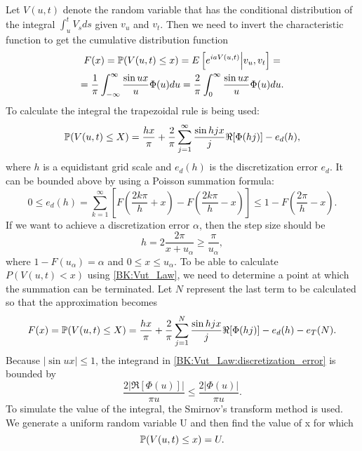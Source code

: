             Let $V(u,t)$  denote the random
            variable that has the conditional distribution of the integral $\int_{u}^t V_s ds$ given $v_u$ and $v_t$.    
            Then we need to invert the characteristic function to get the cumulative distribution function
            \begin{multline}
                F(x) = \P(V(u, t) \leq x) = E\left[ e^{iaV(u,t)} \Big| v_u, v_t\right] =\\= \frac{1}{\pi} \int_{-\infty}^\infty \frac{\sin ux}{u} \Phi(u) du 
                = \frac{2}{\pi} \int_{0}^\infty \frac{\sin ux}{u} \Phi(u) du.
            \end{multline}
            To calculate the integral the trapezoidal rule is being used:
            \begin{equation}\label{BK:Vut_Law}
                \P(V(u, t) \leq X) = \frac{hx}{\pi} + \frac{2}{\pi} \sum_{j=1}^\infty \frac{\sin hjx}{j} \Re[\Phi(hj)] - e_d(h),
            \end{equation}
            where $h$ is a equidistant grid scale and $e_d(h)$ is the discretization error $e_d$.
            It can be bounded above by using a Poisson summation formula:
            \begin{equation}\label{BK:Vut_Law:discretization_error}
                0 \leq e_d(h) = \sum_{k=1}^\infty\left[ F\left(\frac{2k\pi}{h} + x\right) - F\left(\frac{2k\pi}{h} - x\right)\right] \leq 1 - F\left(\frac{2\pi}{h} - x\right).
            \end{equation}
            If we want to achieve a discretization error $\alpha$, then the
            step size should be
            \begin{equation}
                h = 2\frac{2\pi}{x+ u_\alpha} \geq \frac{\pi}{u_\alpha},
            \end{equation}
            where $1-F(u_\alpha) = \alpha$ and $0 \leq x \leq u_\alpha$.
            To be able to calculate $P(V(u, t) < x )$ using \eqref{BK:Vut_Law}, we
            need to determine a point at which the summation can be
            terminated. Let $N$ represent the last term to be calculated
            so that the approximation becomes
            \begin{equation}
                F(x) = \P(V(u, t) \leq X) = \frac{hx}{\pi} + \frac{2}{\pi} \sum_{j=1}^N \frac{\sin hjx}{j} \Re[\Phi(hj)] - e_d(h) - e_T(N).
            \end{equation}
            Because $|\sin ux| \leq 1$, the integrand in \eqref{BK:Vut_Law:discretization_error} is bounded by
            \begin{equation}
                \frac{2|\Re[\Phi(u)]|}{\pi u} \leq \frac{2|\Phi(u)|}{\pi u}.
            \end{equation}
            To simulate the value of the integral, the Smirnov's transform method is used. We generate a uniform 
            random variable U and then find the value of x for which 
            \begin{equation}
                \P(V(u, t) \leq x) = U.
            \end{equation}

